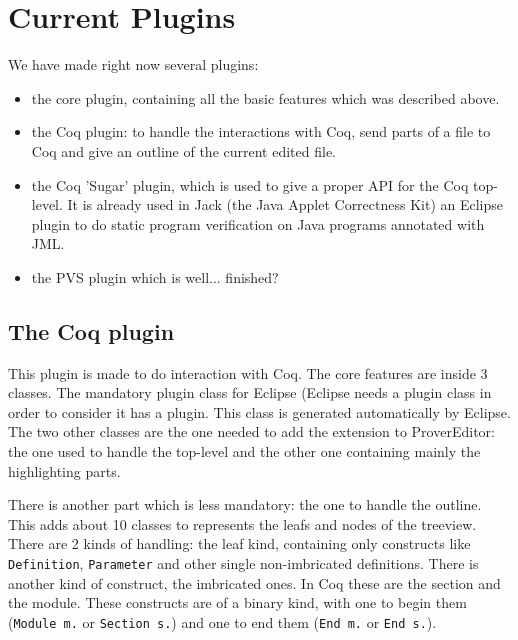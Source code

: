 \documentclass{entcs}
\begin{document}
\section{Current Plugins}
\label{sec:current-plugins}

We have made right now several plugins:
\begin{itemize}
\item the core plugin, containing all the basic features which was described above.
\item the Coq plugin: to handle the interactions with Coq, send parts of a file to Coq
and give an outline of the current edited file.
\item the Coq 'Sugar' plugin, which is used to give a proper API for the Coq top-level.
It is already used in Jack \cite{Jack-Web} (the Java Applet Correctness Kit) an Eclipse plugin
to do static program verification on Java programs annotated with JML.

\item the PVS plugin which is well... finished?
\end{itemize}

\subsection{The Coq plugin}
\label{subsec:coq-plugin}

This plugin is made to do interaction with Coq. The core features
are inside 3 classes. The mandatory plugin class for Eclipse (Eclipse
needs a plugin class in order to consider it has a plugin. This class
is generated automatically by Eclipse. The two other classes are the one
needed to add the extension to ProverEditor: the one used to handle the
top-level and the other one containing mainly the highlighting parts.

There is another part which is less mandatory: the one to handle the outline.
This adds about 10 classes to represents the leafs and nodes of the treeview.
There are 2 kinds of handling: the leaf kind, containing only constructs
like {\tt Definition}, {\tt Parameter} and other single non-imbricated
definitions. There is another kind of construct, the imbricated ones.
In Coq these are the section and the module. These constructs are of
a binary kind, with one to begin them ({\tt Module m.} or {\tt Section s.})
and one to end them ({\tt End m.} or {\tt End s.}).\\
\end{document}
